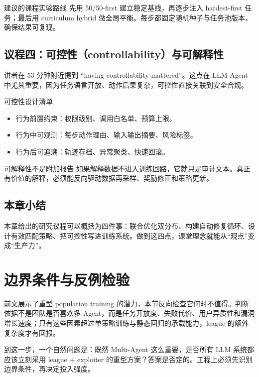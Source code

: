 \documentclass[a4paper]{article}
\begin{document}
\begin{knowledgebox}{建议的课程实验路线}
先用 50/50-first 建立稳定基线，再逐步注入 hardest-first 任务；最后用 curriculum hybrid 做全局平衡。每步都固定随机种子与任务池版本，确保结果可复现。
\end{knowledgebox}

\subsection{议程四：可控性（controllability）与可解释性}
讲者在 53 分钟附近提到 ``having controllability mattered''。这点在 LLM Agent 中尤其重要，因为任务语言开放、动作后果复杂，可控性直接关联到安全合规。

\begin{importantbox}{可控性设计清单}
\begin{itemize}
    \item 行为前置约束：权限级别、调用白名单、预算上限。
    \item 行为中可观测：每步动作理由、输入输出摘要、风险标签。
    \item 行为后可追溯：轨迹存档、异常聚类、快速回滚。
\end{itemize}
\end{importantbox}

\begin{warningbox}{可解释性不是附加报告}
如果解释数据不进入训练回路，它就只是审计文本。真正有价值的解释，必须能反向驱动数据再采样、奖励修正和策略更新。
\end{warningbox}

\subsection{本章小结}
本章给出的研究议程可以概括为四件事：联合优化双分布、构建自动修复循环、设计有效匹配策略、把可控性写进训练系统。做到这四点，课堂理念就能从``观点''变成``生产力''。

\section{边界条件与反例检验}

前文展示了重型 population training 的潜力，本节反向检查它何时不值得。判断依据不是团队是否喜欢多 Agent，而是任务开放度、失败代价、用户异质性和漏洞增长速度；只有这些因素超过单策略训练与静态回归的承载能力，league 的额外复杂度才有回报。

到这一步，一个自然问题是：既然 Multi-Agent 这么重要，是否所有 LLM 系统都应该立刻采用 league + exploiter 的重型方案？答案是否定的。工程上必须先识别边界条件，再决定投入强度。
\end{document}
